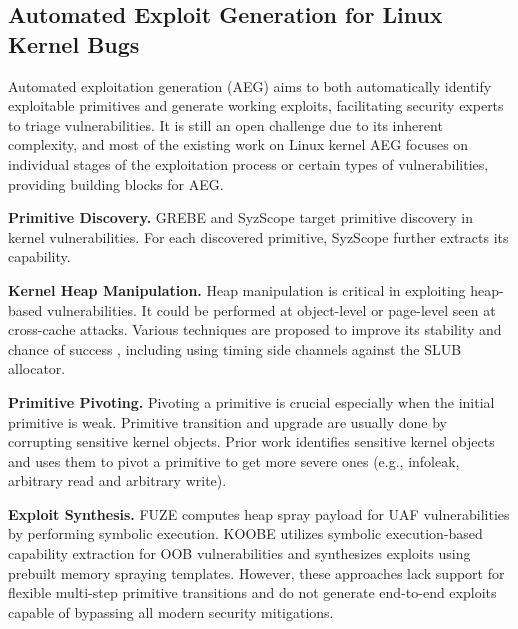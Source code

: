 \subsection{Automated Exploit Generation for Linux Kernel Bugs}
Automated exploitation generation (AEG) \cite{avgerinos2014automatic} aims to both automatically identify exploitable primitives and generate working exploits, facilitating security experts to triage vulnerabilities.
It is still an open challenge due to its inherent complexity, and most of the existing work on Linux kernel AEG focuses on individual stages of the exploitation process or certain types of vulnerabilities, providing building blocks for AEG.

\noindent\textbf{Primitive Discovery.} GREBE \cite{lin2022grebe} and SyzScope \cite{zou2022syzscope} target primitive discovery in kernel vulnerabilities. For each discovered primitive, SyzScope further extracts its capability.

\noindent\textbf{Kernel Heap Manipulation.} Heap manipulation is critical in exploiting heap-based vulnerabilities.
It could be performed at object-level  \cite{chen2019slake} or page-level \cite{pagespray} seen at cross-cache attacks.
Various techniques are proposed to improve its stability and chance of success \cite{zeng2022playing, lee2023pspray, maar2024slubstick}, including using timing side channels against the SLUB allocator.

\noindent\textbf{Primitive Pivoting.} Pivoting a primitive is crucial especially when the initial primitive is weak.
Primitive transition and upgrade are usually done by corrupting sensitive kernel objects.
Prior work identifies sensitive kernel objects \cite{chen2019slake, chen2020systematic, wang2023alphaexp, xie2025bridgerouter} and uses them to pivot a primitive to get more severe ones (e.g., infoleak, arbitrary read and arbitrary write).


\noindent\textbf{Exploit Synthesis.} FUZE \cite{wu2018fuze} computes heap spray payload for UAF vulnerabilities by performing symbolic execution.
KOOBE \cite{chen2020koobe} utilizes symbolic execution-based capability extraction for OOB vulnerabilities and synthesizes exploits using prebuilt memory spraying templates.
However, these approaches lack support for flexible multi-step primitive transitions and do not generate end-to-end exploits capable of bypassing all modern security mitigations.






